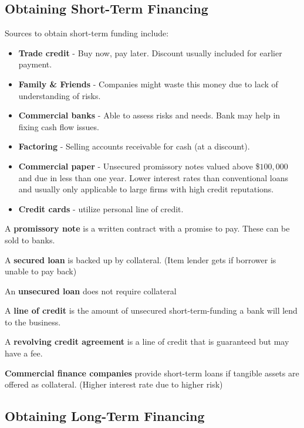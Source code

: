 \documentclass[english, 12pt]{article}
\begin{document}
\subsection{Obtaining Short-Term Financing}
Sources to obtain short-term funding include:
\begin{itemize}
\item \textbf{Trade credit} - Buy now, pay later. Discount usually included for earlier payment.
\item \textbf{Family \& Friends} - Companies might waste this money due to lack of understanding of risks.
\item \textbf{Commercial banks} - Able to assess risks and needs. Bank may help in fixing cash flow issues.
\item \textbf{Factoring} - Selling accounts receivable for cash (at a discount).
\item \textbf{Commercial paper} - Unsecured promissory notes valued above \$$100,000$ and due in less than one year. Lower interest rates than conventional loans and usually only applicable to large firms with high credit reputations.
\item \textbf{Credit cards} - utilize personal line of credit.
\end{itemize}
\begin{defn}
A \textbf{promissory note} is a written contract with a promise to pay. These can be sold to banks.
\end{defn}
\begin{defn}
A \textbf{secured loan} is backed up by collateral. (Item lender gets if borrower is unable to pay back)
\end{defn}
\begin{defn}
An \textbf{unsecured loan} does not require collateral
\end{defn}
\begin{defn}
A \textbf{line of credit} is the amount of unsecured short-term-funding a bank will lend to the business.
\end{defn}
\begin{defn}
A \textbf{revolving credit agreement} is a line of credit that is guaranteed but may have a fee.
\end{defn}
\begin{defn}
\textbf{Commercial finance companies} provide short-term loans if tangible assets are offered as collateral. (Higher interest rate due to higher risk)
\end{defn}
\subsection{Obtaining Long-Term Financing}
\end{document}
